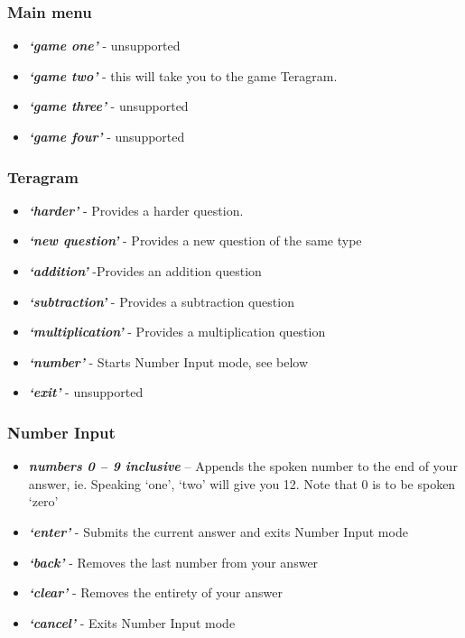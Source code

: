 \documentclass[11pt, oneside]{article}
\begin{document}
\subsubsection*{Main menu}

\begin{itemize}
  \item {\em\bf`game one'} - unsupported
  \item {\em\bf`game two'}  - this will take you to the game Teragram.
  \item {\em\bf`game three'} - unsupported
  \item {\em\bf`game four'} - unsupported
\end{itemize}

\subsubsection*{Teragram}

\begin{itemize}
  \item {\em\bf`harder'} - Provides a harder question. 
  \item {\em\bf`new question'} - Provides a new question of the same type
  \item {\em\bf`addition'} -Provides an addition question
  \item {\em\bf`subtraction'} - Provides a subtraction question
  \item {\em\bf`multiplication'} - Provides a multiplication question 
  \item {\em\bf`number'} - Starts Number Input mode, see below
  \item {\em\bf`exit'} - unsupported
\end{itemize}

\subsubsection*{Number Input}
\begin{itemize}
  \item {\em\bf numbers 0 – 9 inclusive} – Appends the spoken number
    to the end of your answer, ie. Speaking `one', `two' will give you
    12. Note that 0 is to be spoken `zero'
  \item {\em\bf `enter'} - Submits the current answer and exits Number
    Input mode
  \item {\em\bf `back'} - Removes the last number from your answer
  \item {\em\bf `clear'} - Removes the entirety of your answer
  \item {\em\bf `cancel'} - Exits Number Input mode
\end{itemize}
    
\end{document}
